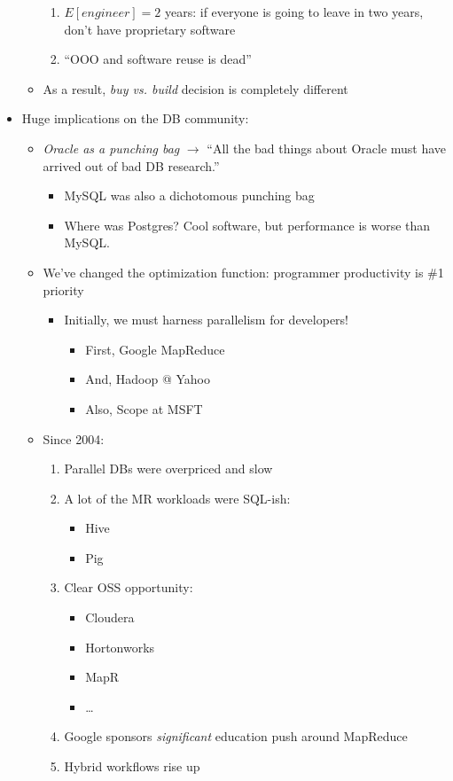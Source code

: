 \documentclass[10pt]{article}
\begin{document}
\begin{itemize}
\begin{itemize}
\begin{enumerate}
\item $E[engineer] = 2$ years: if everyone is going to leave in two years, don't have proprietary software
\item ``OOO and software reuse is dead''
\end{enumerate}
\item As a result, \emph{buy vs. build} decision is completely different
\end{itemize}
\item Huge implications on the DB community:
\begin{itemize}
\item \emph{Oracle as a punching bag} $\rightarrow$ ``All the bad things about Oracle must have arrived
out of bad DB research.''
\begin{itemize}
\item MySQL was also a dichotomous punching bag
\item Where was Postgres? Cool software, but performance is worse than MySQL.
\end{itemize}
\item We've changed the optimization function: programmer productivity is \#1 priority
\begin{itemize}
\item Initially, we must harness parallelism for developers!
\begin{itemize}
\item First, Google MapReduce
\item And, Hadoop @ Yahoo
\item Also, Scope at MSFT
\end{itemize}
\end{itemize}
\item Since 2004:
\begin{enumerate}
\item Parallel DBs were overpriced and slow
\item A lot of the MR workloads were SQL-ish:
\begin{itemize}
\item Hive
\item Pig
\end{itemize}
\item Clear OSS opportunity:
\begin{itemize}
\item Cloudera
\item Hortonworks
\item MapR
\item \dots
\end{itemize}
\item Google sponsors \emph{significant} education push around MapReduce
\item Hybrid workflows rise up
\end{enumerate}
\end{itemize}
\end{itemize}
\end{document}
